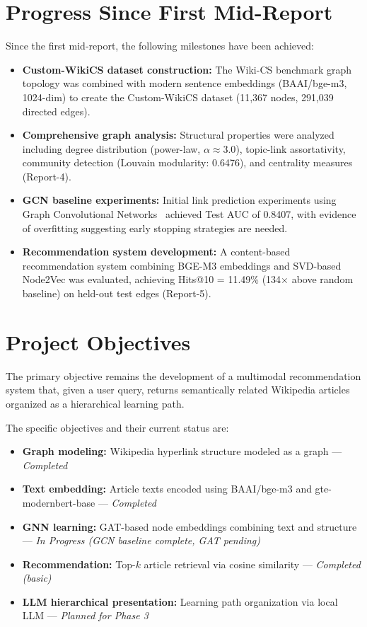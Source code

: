 \section{Progress Since First Mid-Report}

Since the first mid-report, the following milestones have been achieved:

\begin{itemize}
    \item \textbf{Custom-WikiCS dataset construction:} The Wiki-CS benchmark graph topology was combined with modern sentence embeddings (BAAI/bge-m3, 1024-dim) to create the Custom-WikiCS dataset (11,367 nodes, 291,039 directed edges).
    \item \textbf{Comprehensive graph analysis:} Structural properties were analyzed including degree distribution (power-law, $\alpha \approx 3.0$), topic-link assortativity, community detection (Louvain modularity: 0.6476), and centrality measures (Report-4).
    \item \textbf{GCN baseline experiments:} Initial link prediction experiments using Graph Convolutional Networks~\cite{kipf2017semi} achieved Test AUC of 0.8407, with evidence of overfitting suggesting early stopping strategies are needed.
    \item \textbf{Recommendation system development:} A content-based recommendation system combining BGE-M3 embeddings and SVD-based Node2Vec was evaluated, achieving Hits@10 = 11.49\% (134$\times$ above random baseline) on held-out test edges (Report-5).
\end{itemize}

\section{Project Objectives}

The primary objective remains the development of a multimodal recommendation system that, given a user query, returns semantically related Wikipedia articles organized as a hierarchical learning path.

The specific objectives and their current status are:

\begin{itemize}
    \item \textbf{Graph modeling:} Wikipedia hyperlink structure modeled as a graph --- \textit{Completed}
    \item \textbf{Text embedding:} Article texts encoded using BAAI/bge-m3 and gte-modernbert-base --- \textit{Completed}
    \item \textbf{GNN learning:} GAT-based node embeddings combining text and structure --- \textit{In Progress (GCN baseline complete, GAT pending)}
    \item \textbf{Recommendation:} Top-$k$ article retrieval via cosine similarity --- \textit{Completed (basic)}
    \item \textbf{LLM hierarchical presentation:} Learning path organization via local LLM --- \textit{Planned for Phase 3}
\end{itemize}

